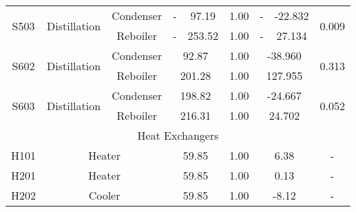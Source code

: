 \begin{table}[h]
{\begin{tabular}{|c|c|c|c|c|c|c|c|c|c|}
\multirow{2}{*}{S503} & \multirow{2}{*}{Distillation}       & Condenser     & -                 & 97.19             & 1.00                            & -                & -22.832          & \multicolumn{2}{c|}{\multirow{2}{*}{0.009}} \\ \cline{3-8}
                      &                                     & Reboiler      & -                 & 253.52            & 1.00                            & -                & 27.134           & \multicolumn{2}{c|}{}                       \\ \hline
\multirow{2}{*}{S602} & \multirow{2}{*}{Distillation}       & Condenser     & \multicolumn{2}{c|}{92.87}            & 1.00                            & \multicolumn{2}{c|}{-38.960}        & \multicolumn{2}{c|}{\multirow{2}{*}{0.313}} \\ \cline{3-8}
                      &                                     & Reboiler      & \multicolumn{2}{c|}{201.28}           & 1.00                            & \multicolumn{2}{c|}{127.955}        & \multicolumn{2}{c|}{}                       \\ \hline
\multirow{2}{*}{S603} & \multirow{2}{*}{Distillation}       & Condenser     & \multicolumn{2}{c|}{198.82}           & 1.00                            & \multicolumn{2}{c|}{-24.667}        & \multicolumn{2}{c|}{\multirow{2}{*}{0.052}} \\ \cline{3-8}
                      &                                     & Reboiler      & \multicolumn{2}{c|}{216.31}           & 1.00                            & \multicolumn{2}{c|}{24.702}         & \multicolumn{2}{c|}{}                       \\ \hline
\multicolumn{10}{|c|}{Heat Exchangers}                                                                                                                                                                                                    \\ \hline
H101                  & \multicolumn{2}{c|}{Heater}                         & \multicolumn{2}{c|}{59.85}            & 1.00                            & \multicolumn{2}{c|}{6.38}           & \multicolumn{2}{c|}{-}                      \\ \hline
H201                  & \multicolumn{2}{c|}{Heater}                         & \multicolumn{2}{c|}{59.85}            & 1.00                            & \multicolumn{2}{c|}{0.13}           & \multicolumn{2}{c|}{-}                      \\ \hline
H202                  & \multicolumn{2}{c|}{Cooler}                         & \multicolumn{2}{c|}{59.85}            & 1.00                            & \multicolumn{2}{c|}{-8.12}          & \multicolumn{2}{c|}{-}                      \\ \hline

\end{tabular}}
\end{table}

